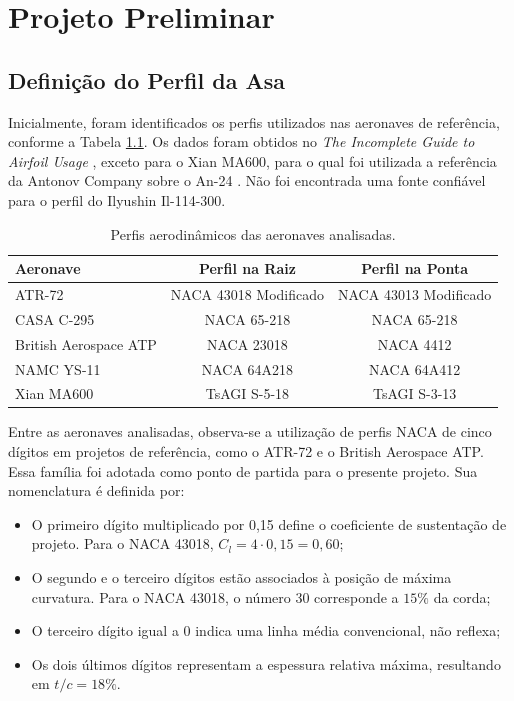 \chapter{Projeto Preliminar}

\section{Definição do Perfil da Asa}

Inicialmente, foram identificados os perfis utilizados nas aeronaves de referência, conforme a Tabela \ref{tab:perfiscomparativos}. Os dados foram obtidos no \textit{The Incomplete Guide to Airfoil Usage} \cite{uiuc_airfoil_database}, exceto para o Xian MA600, para o qual foi utilizada a referência da Antonov Company sobre o An-24 \cite{antonov_an24}. Não foi encontrada uma fonte confiável para o perfil do Ilyushin Il-114-300.

\begin{table}[H]
\centering
\caption{Perfis aerodinâmicos das aeronaves analisadas.}
\label{tab:perfiscomparativos}
\begin{tabular}{|l|c|c|}
\hline
\textbf{Aeronave} & \textbf{Perfil na Raiz} & \textbf{Perfil na Ponta} \\ \hline
ATR-72 & NACA 43018 Modificado & NACA 43013 Modificado  \\ \hline
CASA C-295 & NACA 65-218 & NACA 65-218 \\ \hline
British Aerospace ATP & NACA 23018 & NACA 4412 \\ \hline
NAMC YS-11 & NACA 64A218 & NACA 64A412 \\ \hline
Xian MA600 & TsAGI S-5-18 & TsAGI S-3-13 \\ \hline
\end{tabular}
\end{table}

Entre as aeronaves analisadas, observa-se a utilização de perfis NACA de cinco dígitos em projetos de referência, como o ATR-72 e o British Aerospace ATP. Essa família foi adotada como ponto de partida para o presente projeto. Sua nomenclatura é definida por:

\begin{itemize}
    \item O primeiro dígito multiplicado por 0,15 define o coeficiente de sustentação de projeto. Para o NACA 43018, $C_l = 4 \cdot 0,15 = 0,60$;
    \item O segundo e o terceiro dígitos estão associados à posição de máxima curvatura. Para o NACA 43018, o número 30 corresponde a $15\%$ da corda;
    \item O terceiro dígito igual a 0 indica uma linha média convencional, não reflexa;
    \item Os dois últimos dígitos representam a espessura relativa máxima, resultando em $t/c=18\%$.
\end{itemize}

